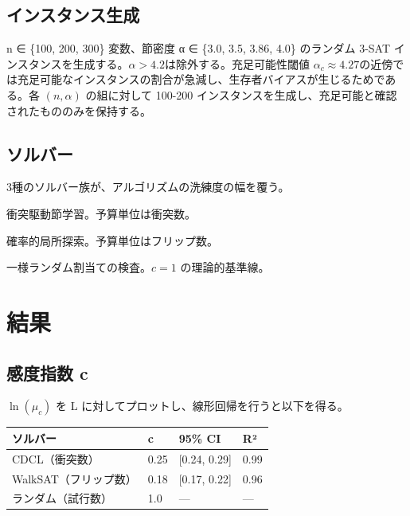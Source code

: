 \documentclass[12pt,a4paper]{article}
\begin{document}
\subsection{インスタンス生成}\label{ux30a4ux30f3ux30b9ux30bfux30f3ux30b9ux751fux6210}

n ∈ \{100, 200, 300\} 変数、節密度 α ∈ \{3.0, 3.5, 3.86, 4.0\} のランダム 3-SAT インスタンスを生成する。\(\alpha > 4.2\)は除外する。充足可能性閾値 \(\alpha_{c} ≈ 4.27\)の近傍では充足可能なインスタンスの割合が急減し、生存者バイアスが生じるためである。各 \((n, \alpha)\) の組に対して 100-200 インスタンスを生成し、充足可能と確認されたもののみを保持する。

\subsection{ソルバー}\label{ux30bdux30ebux30d0ux30fc}

3種のソルバー族が、アルゴリズムの洗練度の幅を覆う。

\begin{definition}
衝突駆動節学習。予算単位は衝突数。
\end{definition}

\begin{definition}
確率的局所探索。予算単位はフリップ数。
\end{definition}

\begin{definition}[ランダム探索]
一様ランダム割当ての検査。$c = 1$ の理論的基準線。
\end{definition}

\section{結果}\label{ux7d50ux679c}

\subsection{感度指数 c}\label{ux611fux5ea6ux6307ux6570-c}

\(\ln(\mu_{c})\) を L に対してプロットし、線形回帰を行うと以下を得る。

{\def\LTcaptype{table} %
\begin{longtable}[]{@{}llll@{}}
\toprule\noalign{}
ソルバー & c & 95\% CI & R² \\
\midrule\noalign{}
\endhead
\bottomrule\noalign{}
\endlastfoot
CDCL（衝突数） & 0.25 & {[}0.24, 0.29{]} & 0.99 \\
WalkSAT（フリップ数） & 0.18 & {[}0.17, 0.22{]} & 0.96 \\
ランダム（試行数） & 1.0 & --- & --- \\
\end{longtable}
}
\end{document}
